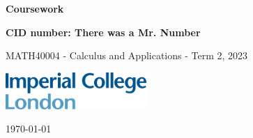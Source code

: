 \documentclass[10pt, a4paper]{article}
\begin{document}
\begin{titlepage}
    \begin{center}
        \vspace*{3cm}
            
        \Huge
        \textbf{
        Coursework}
            
            
        \vspace{1.5cm}
        \Large
            
        \textbf{
        CID number: There was a Mr. Number}%
        
            
        \vfill
        
    MATH40004 - Calculus and Applications - Term 2, 2023
        \vspace{1cm}
            
        \includegraphics[width=0.4\textwidth]{icl_logo.png}
        \\
        
        \Large
        
        \today
            
    \end{center}
\end{titlepage}
\end{document}
